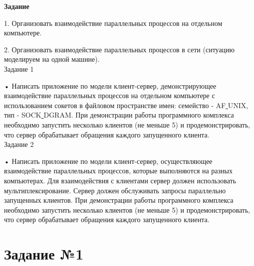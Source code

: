\documentclass[a4paper,14pt]{extreport} %
\begin{document}
\begin{figure}[th]
\noindent\centering{
}
\end{figure}

\newpage

\textbf{Задание}

    1. Организовать взаимодействие параллельных процессов на отдельном компьютере.
    
    2. Организовать взаимодействие параллельных процессов в сети (ситуацию моделируем на одной машине).\\
Задание 1

    • Написать приложение по модели клиент-сервер, демонстрирующее взаимодействие параллельных процессов на отдельном компьютере с использованием сокетов в файловом пространстве имен: семейство - AF\underline{ }UNIX, тип - SOCK\underline{ }DGRAM. При демонстрации работы программного комплекса необходимо запустить несколько клиентов (не меньше 5) и продемонстрировать, что сервер обрабатывает обращения каждого запущенного клиента.\\
Задание 2

    • Написать приложение по модели клиент-сервер, осуществляющее взаимодействие параллельных процессов, которые выполняются на разных компьютерах. Для взаимодействия с клиентами сервер должен использовать мультиплексирование. Сервер должен обслуживать запросы параллельно запущенных клиентов. При демонстрации работы программного комплекса необходимо запустить несколько клиентов (не меньше 5) и продемонстрировать, что сервер обрабатывает обращения каждого запущенного клиента.

\hfill
\newpage
\section*{Задание №1}
\end{document}
